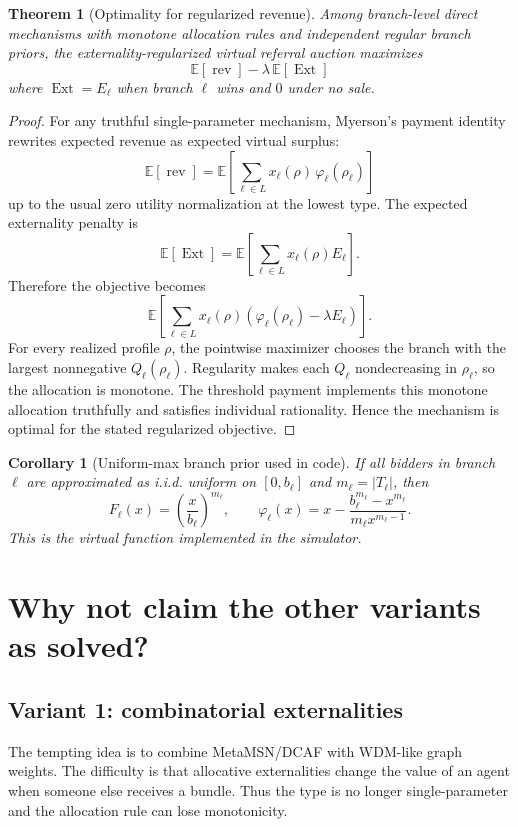 \documentclass[11pt]{article}
\newtheorem{theorem}{Theorem}
\newtheorem{corollary}{Corollary}
\newcommand{\E}{\mathbb{E}}
\newcommand{\rev}{\operatorname{rev}}
\newcommand{\Ext}{\operatorname{Ext}}
\begin{document}
\begin{theorem}[Optimality for regularized revenue]
Among branch-level direct mechanisms with monotone allocation rules and independent regular branch priors, the externality-regularized virtual referral auction maximizes
\[
    \E[\rev]-\lambda\,\E[\Ext]
\]
where $\Ext=E_\ell$ when branch $\ell$ wins and $0$ under no sale.
\end{theorem}
\begin{proof}
For any truthful single-parameter mechanism, Myerson's payment identity rewrites expected revenue as expected virtual surplus:
\[
    \E[\rev]=\E\left[\sum_{\ell\in L} x_\ell(\rho)\,\varphi_\ell(\rho_\ell)\right]
\]
up to the usual zero utility normalization at the lowest type. The expected externality penalty is
\[
    \E[\Ext]=\E\left[\sum_{\ell\in L}x_\ell(\rho)E_\ell\right].
\]
Therefore the objective becomes
\[
    \E\left[\sum_{\ell\in L}x_\ell(\rho)(\varphi_\ell(\rho_\ell)-\lambda E_\ell)\right].
\]
For every realized profile $\rho$, the pointwise maximizer chooses the branch with the largest nonnegative $Q_\ell(\rho_\ell)$. Regularity makes each $Q_\ell$ nondecreasing in $\rho_\ell$, so the allocation is monotone. The threshold payment implements this monotone allocation truthfully and satisfies individual rationality. Hence the mechanism is optimal for the stated regularized objective.
\end{proof}

\begin{corollary}[Uniform-max branch prior used in code]
If all bidders in branch $\ell$ are approximated as i.i.d. uniform on $[0,b_\ell]$ and $m_\ell=|T_\ell|$, then
\[
F_\ell(x)=\left(\frac{x}{b_\ell}\right)^{m_\ell},\qquad
\varphi_\ell(x)=x-\frac{b_\ell^{m_\ell}-x^{m_\ell}}{m_\ell x^{m_\ell-1}}.
\]
This is the virtual function implemented in the simulator.
\end{corollary}

\section{Why not claim the other variants as solved?}

\subsection{Variant 1: combinatorial externalities}

The tempting idea is to combine MetaMSN/DCAF with WDM-like graph weights. The difficulty is that allocative externalities change the value of an agent when someone else receives a bundle. Thus the type is no longer single-parameter and the allocation rule can lose monotonicity.
\end{document}
